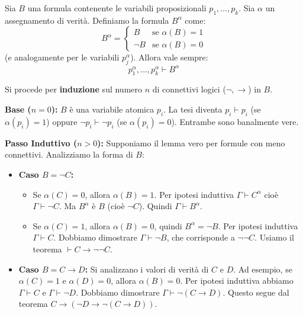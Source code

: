 \documentclass[a4paper,11pt]{report}
\begin{document}
\begin{lemmaframe}{}{}
    Sia \( B \) una formula contenente le variabili proposizionali \( p_1, \dots, p_k \).
    Sia \( \alpha \) un assegnamento di verità. Definiamo la formula \( B^\alpha \) come:
    \[
    B^\alpha = \begin{cases}
    B & \text{se } \alpha(B) = 1 \\
    \neg B & \text{se } \alpha(B) = 0
    \end{cases}
    \]
    (e analogamente per le variabili \( p_j^\alpha \)).
    Allora vale sempre:
    \[ p_1^\alpha, \dots, p_k^\alpha \vdash B^\alpha \]

\begin{pframe}
    Si procede per \textbf{induzione} sul numero \( n \) di connettivi logici (\(\neg, \to\)) in \( B \).

    \textbf{Base (\(n=0\)):} \( B \) è una variabile atomica \( p_i \).
    La tesi diventa \( p_i \vdash p_i \) (se \(\alpha(p_i)=1\)) oppure \( \neg p_i \vdash \neg p_i \) (se \(\alpha(p_i)=0\)). Entrambe sono banalmente vere.

    \textbf{Passo Induttivo (\(n>0\)):}
    Supponiamo il lemma vero per formule con meno connettivi. Analizziamo la forma di \( B \):

    \begin{itemize}
        \item \textbf{Caso \( B = \neg C \):}
        \begin{itemize}
            \item Se \(\alpha(C)=0\), allora \(\alpha(B)=1\). Per ipotesi induttiva \( \Gamma \vdash C^\alpha \) cioè \( \Gamma \vdash \neg C \). Ma \( B^\alpha \) è \( B \) (cioè \( \neg C \)). Quindi \( \Gamma \vdash B^\alpha \).
            \item Se \(\alpha(C)=1\), allora \(\alpha(B)=0\), quindi \( B^{\alpha} = \neg B \). Per ipotesi induttiva \( \Gamma \vdash C \). Dobbiamo dimostrare \( \Gamma \vdash \neg B \), che corrisponde a \( \neg\neg C \). Usiamo il teorema \( \vdash C \to \neg\neg C \).
        \end{itemize}

        \item \textbf{Caso \( B = C \to D \):}
        Si analizzano i valori di verità di \( C \) e \( D \). Ad esempio, se \(\alpha(C)=1\) e \(\alpha(D)=0\), allora \(\alpha(B)=0\).
        Per ipotesi induttiva abbiamo \( \Gamma \vdash C \) e \( \Gamma \vdash \neg D \).
        Dobbiamo dimostrare \( \Gamma \vdash \neg(C \to D) \). Questo segue dal teorema \( C \to (\neg D \to \neg(C \to D)) \).
    \end{itemize}
\end{pframe}
\end{lemmaframe}
\end{document}
